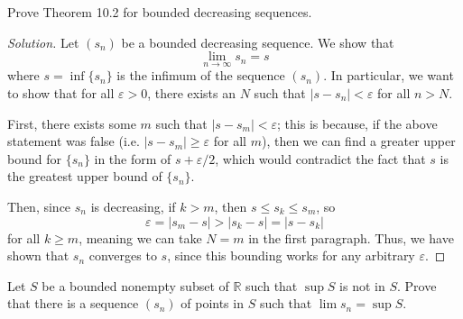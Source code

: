 \documentclass[11pt]{scrartcl}
\providecommand{\eps}{\varepsilon}
\providecommand{\RR}{\mathbb R}
\theoremstyle{problem}
\newenvironment{problem}[1]
{\renewcommand\theinnercustomthm{#1}\innercustomthm}
{\endinnercustomthm}
\theoremstyle{remark}
\newenvironment{soln}{\begin{proof}[Solution]}{\end{proof}}
\begin{document}
\pagebreak
\begin{problem}{10.2}
	Prove Theorem 10.2 for bounded decreasing sequences.
\end{problem}
\begin{soln}
	Let $(s_n)$ be a bounded decreasing sequence. We show that
	\[\lim_{n\to\infty} s_n = s\]
	where $s = \inf\{s_n\}$ is the infimum of the sequence $(s_n)$.
	In particular, we want to show that for all $\eps > 0$,
	there exists an $N$ such that $|s - s_n| < \eps$ for all $n > N$.
	
	First, there exists some $m$ such that $|s - s_m| < \eps$;
	this is because, if the above statement was false
	(i.e. $|s - s_m| \ge \eps$ for all $m$), then we can find a greater
	upper bound for $\{s_n\}$ in the form of $s + \eps/2$, which would
	contradict the fact that $s$ is the greatest upper bound of $\{s_n\}$.
	
	Then, since $s_n$ is decreasing, if $k > m$, then
	$s \le s_k \le s_m$, so
	\[\eps = |s_m - s| > |s_k - s| = |s - s_k|\]
	for all $k \ge m$, meaning we can take $N = m$ in the first paragraph.
	Thus, we have shown that $s_n$ converges to $s$, since this bounding
	works for any arbitrary $\eps$.
\end{soln}
\pagebreak
\begin{problem}{10.7}
	Let $S$ be a bounded nonempty subset of $\RR$ such that
	$\sup S$ is not in $S$. Prove that there is a sequence $(s_n)$
	of points in $S$ such that $\lim s_n = \sup S$.
\end{problem}
\end{document}
